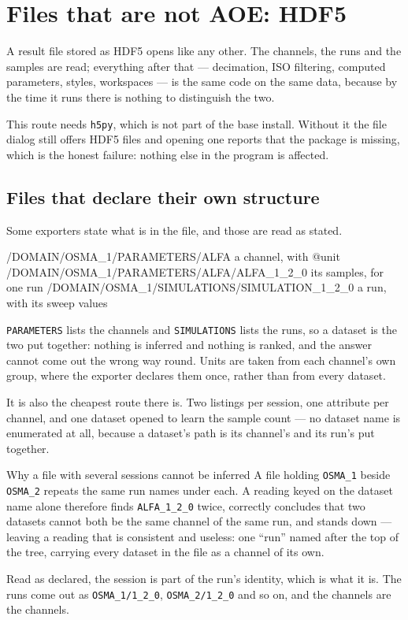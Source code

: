 \documentclass[11pt,a4paper,oneside]{report}
\newcommand{\code}[1]{\texttt{#1}}
\begin{document}
\section{Files that are not AOE: HDF5}
\label{sec:hdf5}

A result file stored as HDF5 opens like any other. The channels, the runs and
the samples are read; everything after that --- decimation, ISO filtering,
computed parameters, styles, workspaces --- is the same code on the same data,
because by the time it runs there is nothing to distinguish the two.

This route needs \code{h5py}, which is not part of the base install. Without it
the file dialog still offers HDF5 files and opening one reports that the package
is missing, which is the honest failure: nothing else in the program is
affected.

\subsection*{Files that declare their own structure}

Some exporters state what is in the file, and those are read as stated.

\begin{aoecode}
/DOMAIN/OSMA_1/PARAMETERS/ALFA               a channel, with @unit
/DOMAIN/OSMA_1/PARAMETERS/ALFA/ALFA_1_2_0    its samples, for one run
/DOMAIN/OSMA_1/SIMULATIONS/SIMULATION_1_2_0  a run, with its sweep values
\end{aoecode}

\code{PARAMETERS} lists the channels and \code{SIMULATIONS} lists the runs, so
a dataset is the two put together: nothing is inferred and nothing is ranked,
and the answer cannot come out the wrong way round. Units are taken from each
channel's own group, where the exporter declares them once, rather than from
every dataset.

It is also the cheapest route there is. Two listings per session, one attribute
per channel, and one dataset opened to learn the sample count --- no dataset
name is enumerated at all, because a dataset's path is its channel's and its
run's put together.

\begin{aoenote}{Why a file with several sessions cannot be inferred}
A file holding \code{OSMA\_1} beside \code{OSMA\_2} repeats the same run names
under each. A reading keyed on the dataset name alone therefore finds
\code{ALFA\_1\_2\_0} twice, correctly concludes that two datasets cannot both
be the same channel of the same run, and stands down --- leaving a reading
that is consistent and useless: one ``run'' named after the top of the tree,
carrying every dataset in the file as a channel of its own.

Read as declared, the session is part of the run's identity, which is what it
is. The runs come out as \code{OSMA\_1/1\_2\_0}, \code{OSMA\_2/1\_2\_0} and so
on, and the channels are the channels.
\end{aoenote}
\end{document}
